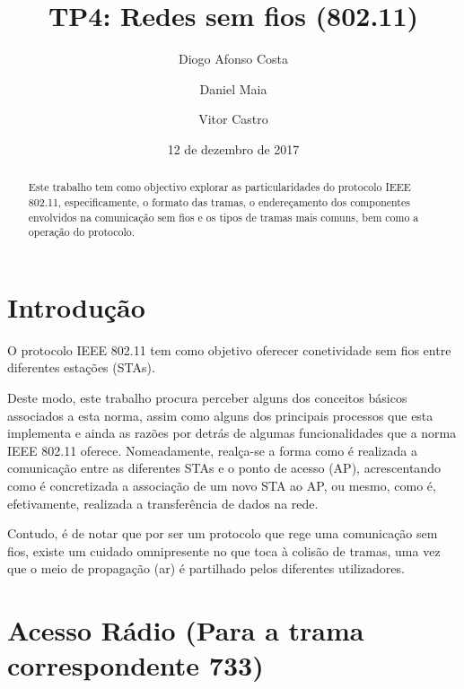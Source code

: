 \documentclass{llncs}
\begin{document}
\mainmatter
\title{TP4: Redes sem fios (802.11)}


\author{Diogo Afonso Costa \and Daniel Maia \and Vitor Castro}



\date{12 de dezembro de 2017}


\maketitle
\begin{abstract}

Este trabalho tem como objectivo explorar as particularidades do protocolo IEEE 802.11, especificamente, o formato das tramas, o endereçamento dos componentes envolvidos na comunicação sem fios e os tipos de tramas mais comuns, bem como a operação do protocolo.

\end{abstract}

\section{Introdução}

O protocolo IEEE 802.11 tem como objetivo oferecer conetividade sem fios entre  diferentes estações (STAs).

Deste modo, este trabalho procura perceber alguns dos conceitos básicos associados a esta norma, assim como alguns dos principais processos que esta implementa e ainda as razões por detrás de algumas funcionalidades que a norma IEEE 802.11 oferece. Nomeadamente, realça-se a forma como é realizada a comunicação entre as diferentes STAs e o ponto de acesso (AP), acrescentando como é concretizada a associação de um novo STA ao AP, ou mesmo, como é, efetivamente, realizada a transferência de dados na rede.

Contudo, é de notar que por ser um protocolo que rege uma comunicação sem fios, existe um cuidado omnipresente no que toca à colisão de tramas, uma vez que o meio de propagação (ar) é partilhado pelos diferentes utilizadores.

\clearpage
\section{Acesso Rádio (Para a trama correspondente 733)}
\end{document}
